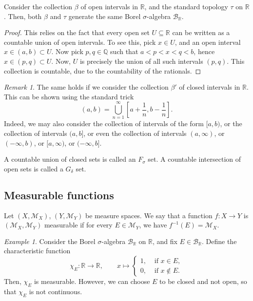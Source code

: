 \documentclass[11pt]{article}
\newcommand{\R}{\mathbb{R}}
\newcommand{\Q}{\mathbb{Q}}
\newcommand{\M}{\mathcal{M}}
\theoremstyle{definition}
\theoremstyle{remark}
\newtheorem*{remark}{Remark}
\newtheorem*{example}{Example}
\numberwithin{equation}{section}
\begin{document}
    \begin{theorem}
        Consider the collection $\beta$ of open intervals in $\R$, and the standard
        topology $\tau$ on $\R$. Then, both $\beta$ and $\tau$ generate the same
        Borel $\sigma$-algebra $\mathcal{B}_\R$.
    \end{theorem}
    \begin{proof}
        This relies on the fact that every open set $U \subseteq \R$ can be written
        as a countable union of open intervals. To see this, pick $x \in U$, and an
        open interval $x \in (a, b) \subset U$. Now pick $p, q \in \Q$ such that $a <
        p < x < q < b$, hence $x \in (p, q) \subset U$. Now, $U$ is precisely the
        union of all such intervals $(p, q)$. This collection is countable, due to
        the countability of the rationals.
    \end{proof}
    \begin{remark}
        The same holds if we consider the collection $\beta'$ of closed intervals in
        $\R$. This can be shown using the standard trick \[
            (a, b) = \bigcup_{n = 1}^\infty \left[a + \frac{1}{n}, b -
            \frac{1}{n}\right].
        \] Indeed, we may also consider the collection of intervals of the form $[a,
        b)$, or the collection of intervals $(a, b]$, or even the collection of
        intervals $(a, \infty)$, or $(-\infty, b)$, or $[a, \infty)$, or $(-\infty,
        b]$.
    \end{remark}

    \begin{definition}
        A countable union of closed sets is called an $F_\sigma$ set. A countable
        intersection of open sets is called a $G_\delta$ set.
    \end{definition}


    \subsection{Measurable functions}

    \begin{definition}
        Let $(X, \M_X)$, $(Y, \M_Y)$ be measure spaces. We say that a function
        $f\colon X \to Y$ is $(\M_X, \M_Y)$ measurable if for every $E \in \M_Y$, we
        have $f^{-1}(E) = \M_X$.
    \end{definition}
    \begin{example}
        Consider the Borel $\sigma$-algebra $\mathcal{B}_\R$ on $\R$, and fix $E \in
        \mathcal{B}_\R$. Define the characteristic function \[
            \chi_E\colon \R \to \R, \qquad x \mapsto \begin{cases}
                1, &\text{ if } x \in E, \\
                0, &\text{ if } x \notin E.
            \end{cases}
        \] Then, $\chi_E$ is measurable. However, we can choose $E$ to be closed and
        not open, so that $\chi_E$ is not continuous.
    \end{example}
\end{document}
